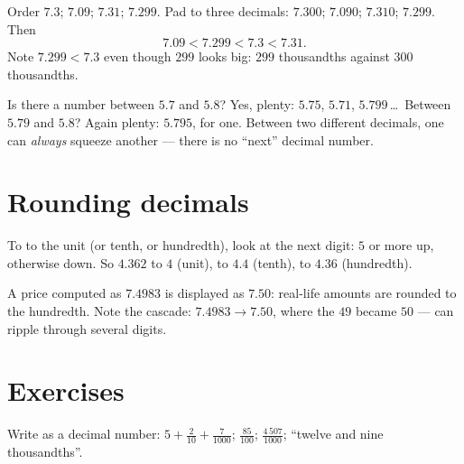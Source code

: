 \begin{example}\label{ex:g5:decimals:order}
Order $7.3$; $7.09$; $7.31$; $7.299$. Pad to three decimals:
$7.300$; $7.090$; $7.310$; $7.299$. Then
\[
7.09 < 7.299 < 7.3 < 7.31 .
\]
Note $7.299 < 7.3$ even though $299$ looks big: $299$ thousandths
against $300$ thousandths.
\end{example}

\begin{example}\label{ex:g5:decimals:between}
Is there a number between $5.7$ and $5.8$? Yes, plenty: $5.75$,
$5.71$, $5.799$\,\dots\ Between $5.79$ and $5.8$? Again plenty:
$5.795$, for one. Between two different decimals, one can
\emph{always} squeeze another --- there is no ``next'' decimal
number.
\end{example}

\section{Rounding decimals}

\begin{definition}[Rounding]\label{def:g5:decimals:round}
To  to the unit (or tenth, or hundredth), look at the next
digit: $5$ or more  up, otherwise  down. So $4.362$
 to $4$ (unit), to $4.4$ (tenth), to $4.36$ (hundredth).
\end{definition}

\begin{example}\label{ex:g5:decimals:money}
A price computed as $7.4983$ is displayed as $7.50$: real-life
amounts are rounded to the hundredth. Note the cascade: $7.4983 \to
7.50$, where the $49$ became $50$ ---  can ripple through
several digits.
\end{example}

\section{Exercises}

\begin{exercise}[$\star$]\label{exo:g5:decimals:1}
Write as a decimal number: $5 + \frac{2}{10} + \frac{7}{1000}$;
\quad $\frac{85}{100}$; \quad $\frac{4\,507}{1000}$; \quad ``twelve
and nine thousandths''.
\end{exercise}

